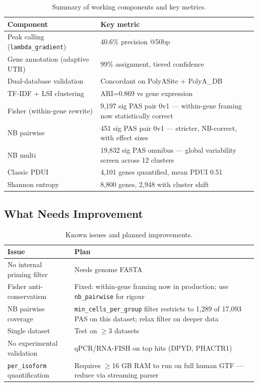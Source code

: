 \documentclass[11pt,a4paper]{article}
\begin{document}
\begin{table}[htbp]
  \centering
  \caption{Summary of working components and key metrics.}
  \label{tab:summary_works}
  \begin{tabularx}{\textwidth}{lX}
    \toprule
    \textbf{Component} & \textbf{Key metric} \\
    \midrule
    Peak calling (\texttt{lambda\_gradient}) & 40.6\% precision @50bp \\
    Gene annotation (adaptive UTR) & 99\% assignment, tiered confidence \\
    Dual-database validation & Concordant on PolyASite + PolyA\_DB \\
    TF-IDF + LSI clustering & ARI=0.869 vs gene expression \\
    Fisher (within-gene rewrite) & 9,197 sig PAS pair 0v1 --- within-gene framing
      now statistically correct \\
    NB pairwise & 451 sig PAS pair 0v1 --- stricter, NB-correct, with effect sizes \\
    NB multi & 19,832 sig PAS omnibus --- global variability screen across 12 clusters \\
    Classic PDUI & 4,101 genes quantified, mean PDUI 0.51 \\
    Shannon entropy & 8,800 genes, 2,948 with cluster shift \\
    \bottomrule
  \end{tabularx}
\end{table}

\subsection{What Needs Improvement}

\begin{table}[htbp]
  \centering
  \caption{Known issues and planned improvements.}
  \label{tab:summary_todo}
  \begin{tabularx}{\textwidth}{lX}
    \toprule
    \textbf{Issue} & \textbf{Plan} \\
    \midrule
    No internal priming filter & Needs genome FASTA \\
    Fisher anti-conservatism & Fixed: within-gene framing now in production; use
      \texttt{nb\_pairwise} for rigour \\
    NB pairwise coverage & \texttt{min\_cells\_per\_group} filter restricts to 1,289
      of 17,093 PAS on this dataset; relax filter on deeper data \\
    Single dataset & Test on $\geq$3 datasets \\
    No experimental validation & qPCR/RNA-FISH on top hits (DPYD, PHACTR1) \\
    \texttt{per\_isoform} quantification & Requires $\geq$16 GB RAM to run on full
      human GTF --- reduce via streaming parser \\
    \bottomrule
  \end{tabularx}
\end{table}
\end{document}
